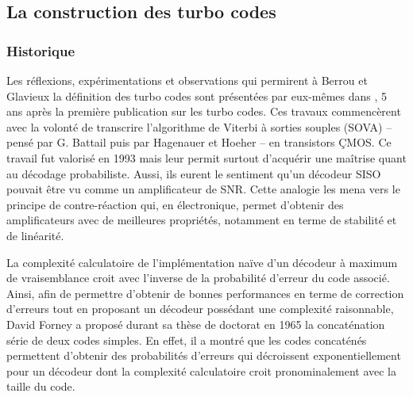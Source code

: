 \subsection{La construction des turbo codes}
\subsubsection{Historique}
Les réflexions, expérimentations et observations qui permirent à Berrou et Glavieux la définition des turbo codes sont 
présentées par eux-mêmes dans \cite{berrou1998reflections}, 5 ans après la première publication sur les turbo codes. 
Ces travaux commencèrent avec la volonté de transcrire l'algorithme de Viterbi à sorties souples (SOVA) -- pensé par G. 
Battail \cite{Battail1987} puis par Hagenauer et Hoeher \cite{HagenHoerViter} -- en transistors ÇMOS. Ce travail fut 
valorisé en 1993 \cite{BerrouHardwareSOVA} mais leur permit surtout d'acquérir une maîtrise quant au décodage 
probabiliste. Aussi, ils eurent le sentiment qu'un décodeur SISO pouvait être vu comme un amplificateur de SNR. Cette 
analogie les mena vers le principe de contre-réaction qui, en électronique, permet d'obtenir des amplificateurs avec de 
meilleures propriétés, notamment en terme de stabilité et de linéarité.

La complexité calculatoire de l’implémentation naïve d'un décodeur à maximum de vraisemblance croit avec l'inverse de la 
probabilité d'erreur du code associé. Ainsi, afin de permettre d'obtenir de bonnes performances en terme de correction 
d'erreurs tout en proposant un décodeur possédant une complexité raisonnable, David Forney a proposé durant sa thèse de 
doctorat en 1965 la concaténation série de deux codes \og simples\fg \cite{forney1966concatenated}. En effet, il a montré 
que les codes concaténés permettent d'obtenir des probabilités d'erreurs qui décroissent exponentiellement pour un décodeur dont la 
complexité calculatoire croit pronominalement avec la taille du code.

